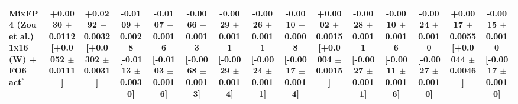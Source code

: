 \begin{tabular}{lcccccccccccccc}
MixFP4 (Zou et al.) 1x16 (W) + FO6 act$^\ast$ & +0.0030 $\pm$ 0.0112 [+0.0052 $\pm$ 0.0111] & +0.0292 $\pm$ 0.0032 [+0.0302 $\pm$ 0.0031] & -0.0109 $\pm$ 0.0028 [-0.0113 $\pm$ 0.0030] & -0.0107 $\pm$ 0.0016 [-0.0103 $\pm$ 0.0016] & -0.0066 $\pm$ 0.0013 [-0.0068 $\pm$ 0.0013] & -0.0029 $\pm$ 0.0011 [-0.0029 $\pm$ 0.0014] & -0.0026 $\pm$ 0.0011 [-0.0024 $\pm$ 0.0011] & -0.0010 $\pm$ 0.0008 [-0.0017 $\pm$ 0.0014] & +0.0002 $\pm$ 0.0015 [+0.0004 $\pm$ 0.0015] & -0.0028 $\pm$ 0.0011 [-0.0027 $\pm$ 0.0011] & -0.0010 $\pm$ 0.0016 [-0.0011 $\pm$ 0.0016] & -0.0024 $\pm$ 0.0010 [-0.0027 $\pm$ 0.0010] & +0.0017 $\pm$ 0.0055 [+0.0044 $\pm$ 0.0046] & -0.0015 $\pm$ 0.0010 [-0.0017 $\pm$ 0.0010] \\
\bottomrule
\end{tabular}
